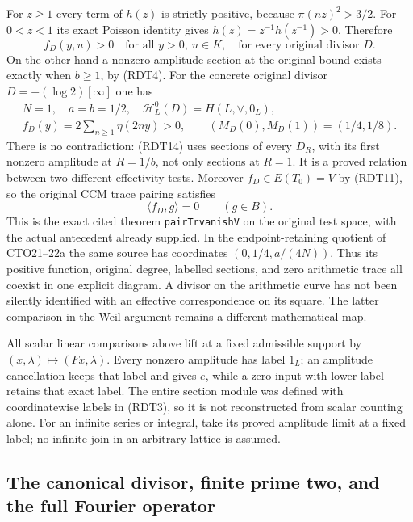 For $z\ge1$ every term of $h(z)$ is strictly positive, because
$\pi(nz)^2>3/2$. For $0<z<1$ its exact Poisson identity gives
$h(z)=z^{-1}h(z^{-1})>0$. Therefore
\begin{equation}\tag{RDT19}
f_D(y,u)>0\quad\text{for all }y>0,\ u\in K,
\quad\text{for every original divisor }D.
\end{equation}
On the other hand a nonzero amplitude section at the original bound
exists exactly when $b\ge1$, by (RDT4). For the concrete original
divisor $D=-(\log2)[\infty]$ one has
\[
\begin{gathered}
N=1,\quad a=b=1/2,\quad
\mathcal H_L^0(D)=H(L,\vee,0_L),\\
f_D(y)=2\sum_{n\ge1}\eta(2ny)>0,\qquad
(M_D(0),M_D(1))=(1/4,1/8).
\end{gathered}
\]
There is no contradiction: (RDT14) uses sections of every $D_R$,
with its first nonzero amplitude at $R=1/b$, not only sections at
$R=1$. It is a proved relation between two different effectivity
tests. Moreover $f_D\in E(T_0)=V$ by (RDT11), so the original
CCM trace pairing satisfies
\begin{equation}\tag{RDT20}
\langle f_D,g\rangle=0\qquad(g\in B).
\end{equation}
This is the exact cited theorem \texttt{pairTrvanishV} on the original
test space, with the actual antecedent already supplied. In the
endpoint-retaining quotient of CTO21--22a the same source has
coordinates $(0,1/4,a/(4N))$. Thus its positive function, original
degree, labelled sections, and zero arithmetic trace all coexist
in one explicit diagram. A divisor on the arithmetic curve has not
been silently identified with an effective correspondence on its
square. The latter comparison in the Weil argument remains a
different mathematical map.

All scalar linear comparisons above lift at a fixed admissible
support by $(x,\lambda)\mapsto(Fx,\lambda)$. Every nonzero amplitude
has label $1_L$; an amplitude cancellation keeps that label and gives
$e$, while a zero input with lower label retains that exact label.
The entire section module was defined with coordinatewise labels
in (RDT3), so it is not reconstructed from scalar counting alone.
For an infinite series or integral, take its proved amplitude limit
at a fixed label; no infinite join in an arbitrary lattice is assumed.

\subsection{The canonical divisor, finite prime two, and the full Fourier operator}

